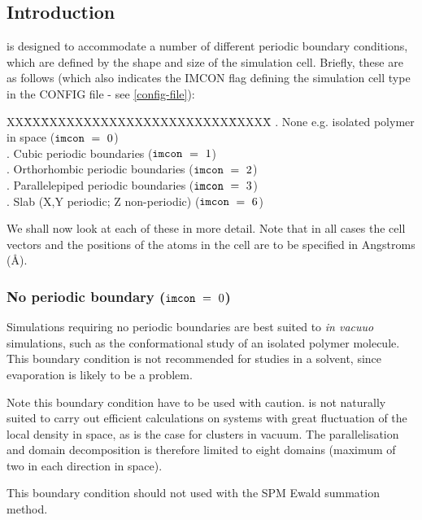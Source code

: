 \label{boundary-conditions}
\subsection*{Introduction}

\D is designed to accommodate a number of different periodic
boundary conditions, which are defined
by the shape and size of the simulation cell.  Briefly, these are
as follows (which also indicates the IMCON flag defining the
simulation cell type in the CONFIG file - see \ref{config-file}):
\begin{tabbing}
XX\=XX\=XXXXXXXXXXXXXXXXXXXXXX\=XXXXX\=\kill
 . \> None e.g. isolated polymer in space                  \> (${\tt imcon}~=~0$) \\
 . \> Cubic periodic boundaries \> (${\tt imcon}~=~1$) \\
 . \> Orthorhombic periodic boundaries                     \> (${\tt imcon}~=~2$) \\
 . \> Parallelepiped periodic boundaries                   \> (${\tt imcon}~=~3$) \\
 . \> Slab (X,Y periodic; Z non-periodic)                  \> (${\tt imcon}~=~6$)
\end{tabbing}
We shall now look at each of these in more detail.  Note that in
all cases the cell vectors and the positions of the atoms in the
cell are to be specified in Angstroms (\AA).

\subsubsection*{No periodic boundary (${\tt imcon}~=~0$)}

Simulations requiring no periodic boundaries are best suited to
{\em in vacuuo} simulations, such as the conformational study of
an isolated polymer molecule.  This boundary condition is not
recommended for studies in a solvent, since evaporation is likely
to be a problem.

Note this boundary condition have to be used with caution.  \D is
not naturally suited to carry out efficient calculations on
systems with great fluctuation of the local density in space, as
is the case for clusters in vacuum.  The parallelisation and
domain decomposition is therefore limited to eight domains
(maximum of two in each direction in space).

This boundary condition should not used with the SPM Ewald
summation method.


